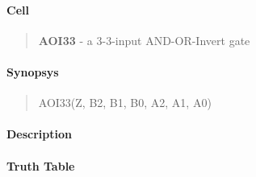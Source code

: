 \label{AOI33}
\paragraph{Cell}
\begin{quote}
    \textbf{AOI33} - a 3-3-input AND-OR-Invert gate
\end{quote}

\paragraph{Synopsys}
\begin{quote}
    AOI33(Z, B2, B1, B0, A2, A1, A0)
\end{quote}

\paragraph{Description}



\paragraph{Truth Table}


